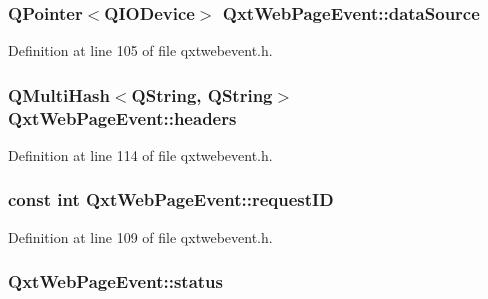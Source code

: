 \hypertarget{class_qxt_web_page_event_ae348a623f5b063e3dfa79ad4faf8ffd6}{
\subsubsection[{data\-Source}]{\setlength{\rightskip}{0pt plus 5cm}Q\-Pointer$<$Q\-I\-O\-Device$>$ Qxt\-Web\-Page\-Event\-::data\-Source}}\label{class_qxt_web_page_event_ae348a623f5b063e3dfa79ad4faf8ffd6}


Definition at line 105 of file qxtwebevent.\-h.

\hypertarget{class_qxt_web_page_event_a182c447e590bf659dc7592329fa34653}{
\subsubsection[{headers}]{\setlength{\rightskip}{0pt plus 5cm}Q\-Multi\-Hash$<${\bf Q\-String}, {\bf Q\-String}$>$ Qxt\-Web\-Page\-Event\-::headers}}\label{class_qxt_web_page_event_a182c447e590bf659dc7592329fa34653}


Definition at line 114 of file qxtwebevent.\-h.

\hypertarget{class_qxt_web_page_event_a144c8010cc1c9d239bf5de4c72d09f7a}{
\subsubsection[{request\-I\-D}]{\setlength{\rightskip}{0pt plus 5cm}const {\bf int} Qxt\-Web\-Page\-Event\-::request\-I\-D}}\label{class_qxt_web_page_event_a144c8010cc1c9d239bf5de4c72d09f7a}


Definition at line 109 of file qxtwebevent.\-h.

\hypertarget{class_qxt_web_page_event_a3faa95fe00502400daa87a3a88e50d86}{
\subsubsection[{status}]{ Qxt\-Web\-Page\-Event\-::status}}\label{class_qxt_web_page_event_a3faa95fe00502400daa87a3a88e50d86}


